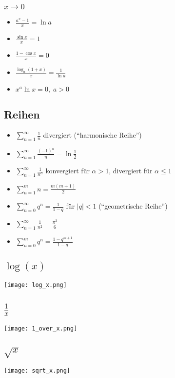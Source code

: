 \subsubsection{$x \to 0$}
\begin{multicols}{2}
\begin{itemize}[leftmargin=*]
  \item $\frac{a^x - 1}{x} = \ln a$
  \item $\frac{\sin x}{x} = 1$
  \item $\frac{1 - \cos x}{x} = 0$
  \item $\frac{\log_a (1 + x)}{x} = \frac{1}{\ln a}$
  \item $x^a \ln x = 0, \; a  > 0$
\end{itemize}
\end{multicols}

\subsection{Reihen}
\begin{itemize}[leftmargin=*]
	\item $\sum_{n=1}^\infty \frac{1}{n}$ divergiert (``harmonische Reihe'')
	\item $\sum_{n=1}^\infty \frac{(-1)^n}{n} = \ln \frac{1}{2}$
	\item $\sum_{n=1}^\infty \frac{1}{n^\alpha}$ konvergiert für $\alpha > 1$,
	divergiert für $\alpha \leq 1$
	\item $\sum_{n=1}^m n = \frac{m(m+1)}{2}$
	\item $\sum_{n=0}^\infty q^n = \frac{1}{1-q}$ für $|q| < 1$ (``geometrische
	Reihe'')
	\item $\sum_{n=1}^\infty \frac{1}{n^2} = \frac{\pi^2}{6}$
	\item $\sum_{n=0}^m q^n = \frac{1-q^{m+1}}{1-q}$ 
\end{itemize}

\subsection{\texorpdfstring{$\log(x)$}{log(x)}}
\texttt{[image: log\_x.png]}

\subsection{\texorpdfstring{$\frac{1}{x}$}{1/x}}
\texttt{[image: 1\_over\_x.png]}

\subsection{\texorpdfstring{$\sqrt{x}$}{x^(1/x)}}
\texttt{[image: sqrt\_x.png]}

